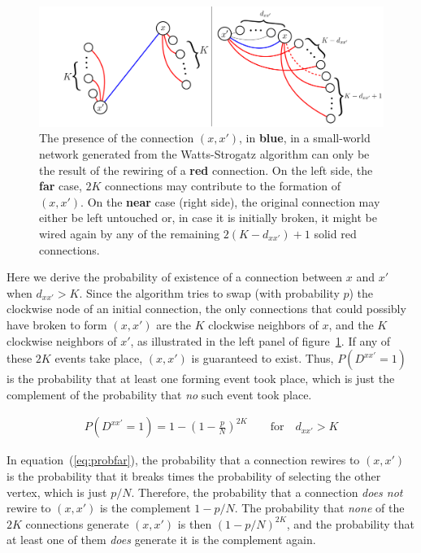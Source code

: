 \begin{figure}
  \centering
  \includegraphics[width=0.9\linewidth]{fig/rewire_contributions.png}
	\caption{The presence of the connection $(x,x')$, in {\color{blue}\textbf{blue}}, in a small-world network generated from the
		Watts-Strogatz algorithm can only be the result of the rewiring of a {\color{red}\textbf{red}} connection. On the left side, the
		\textbf{far} case, $2K$ connections may contribute to the formation of $(x,x')$. On the \textbf{near} case (right side), the
		original connection may either be left untouched or, in case it is initially broken, it might be wired again by any of the
	remaining $2(K-d_{xx'})+1$ solid {\color{red} red} connections.}
  \label{fig:rewire_contributions}
\end{figure}

Here we derive the probability of existence of a connection between $x$ and $x'$ when $d_{xx'}>K$. Since the algorithm tries to swap
(with probability $p$) the clockwise node of an initial connection, the only connections that could possibly have broken to form
$(x,x')$ are the $K$ clockwise neighbors of $x$, and the $K$ clockwise neighbors of $x'$, as illustrated in the left panel of
figure~\ref{fig:rewire_contributions}. If any of these $2K$ events take place, $(x,x')$ is guaranteed to exist. Thus, $P(D^{xx'}=1)$ is
the probability that at least one forming event took place, which is just the complement of the probability that \textit{no} such event
took place.

\begin{align}
  P(D^{xx'}=1) = 1 - \left( 1 - \frac{p}{N} \right)^{2K} \qquad \text{for} \quad d_{xx'} > K
  \label{eq:probfar}
\end{align}

In equation~(\ref{eq:probfar}), the probability that a connection rewires to $(x,x')$ is the probability that it breaks times the
probability of selecting the other vertex, which is just $p/N$. Therefore, the probability that a connection \textit{does not} rewire
to $(x,x')$ is the complement $1-p/N$. The probability that \textit{none} of the $2K$ connections generate $(x,x')$ is then
$(1-p/N)^{2K}$, and the probability that at least one of them \textit{does} generate it is the complement again.

